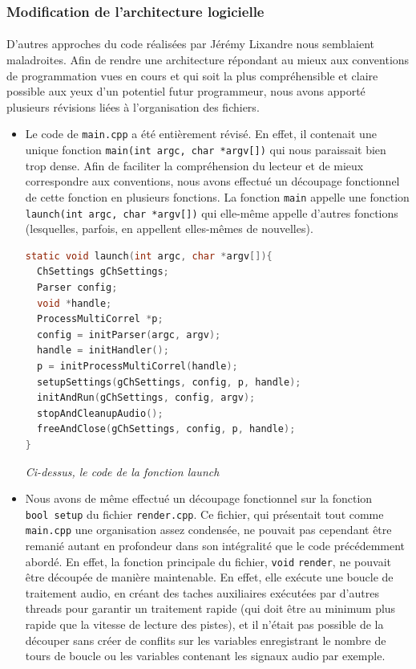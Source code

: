\subsubsection{Modification de l'architecture logicielle}
\paragraph{}
D'autres approches du code réalisées par Jérémy Lixandre nous
semblaient maladroites. Afin de rendre une architecture répondant au
mieux aux conventions de programmation vues en cours et qui soit la
plus compréhensible et claire possible aux yeux d'un potentiel futur
programmeur, nous avons apporté plusieurs révisions liées à
l'organisation des fichiers.
\begin{itemize}
 \item Le code de \verb!main.cpp! a été entièrement révisé. En effet,
       il contenait une unique fonction
       \verb!main(int argc, char *argv[])! qui nous paraissait bien trop
       dense. Afin de faciliter la compréhension du lecteur et de mieux
       correspondre aux conventions, nous avons effectué un découpage
       fonctionnel de cette fonction en plusieurs fonctions. La fonction
       \verb!main! appelle une fonction
       \verb!launch(int argc, char *argv[])! qui elle-même appelle
       d'autres fonctions (lesquelles, parfois, en appellent elles-mêmes
       de nouvelles).

       \begin{lstlisting}[language=C, frame=single, breaklines=true]
static void launch(int argc, char *argv[]){
  ChSettings gChSettings;
  Parser config;
  void *handle;
  ProcessMultiCorrel *p;
  config = initParser(argc, argv);
  handle = initHandler();
  p = initProcessMultiCorrel(handle);
  setupSettings(gChSettings, config, p, handle);
  initAndRun(gChSettings, config, argv);
  stopAndCleanupAudio();
  freeAndClose(gChSettings, config, p, handle);
}
 \end{lstlisting}

 \begin{center}
  \textit{Ci-dessus, le code de la fonction launch}
 \end{center}

 \item Nous avons de même effectué un découpage fonctionnel sur la
       fonction \\ \verb!bool setup!  du fichier \verb!render.cpp!. Ce
       fichier, qui présentait tout comme \verb!main.cpp! une
       organisation assez condensée, ne pouvait pas cependant être
       remanié autant en profondeur dans son intégralité que le code
       précédemment abordé. En effet, la fonction principale du
       fichier, \verb!void!  \verb!render!, ne pouvait être découpée de
       manière maintenable. En effet, elle exécute une boucle de
       traitement audio, en créant des taches auxiliaires exécutées par
       d'autres threads pour garantir un traitement rapide (qui doit
       être au minimum plus rapide que la vitesse de lecture des
       pistes), et il n'était pas possible de la découper sans créer de
       conflits sur les variables enregistrant le nombre de tours de
       boucle ou les variables contenant les signaux audio par exemple.


\end{itemize}

